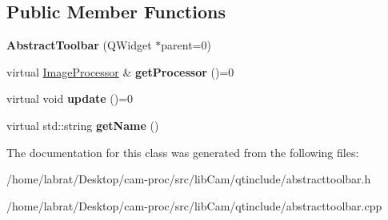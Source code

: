\subsection*{Public Member Functions}
\begin{DoxyCompactItemize}
\item 
{\bfseries Abstract\+Toolbar} (Q\+Widget $\ast$parent=0)\hypertarget{classAbstractToolbar_a9f7e3ff248be380c39f3370f585d356d}{}\label{classAbstractToolbar_a9f7e3ff248be380c39f3370f585d356d}

\item 
virtual \hyperlink{classImageProcessor}{Image\+Processor} \& {\bfseries get\+Processor} ()=0\hypertarget{classAbstractToolbar_adb5af62a3c4a558c69101bdd6f3d1dc1}{}\label{classAbstractToolbar_adb5af62a3c4a558c69101bdd6f3d1dc1}

\item 
virtual void {\bfseries update} ()=0\hypertarget{classAbstractToolbar_aac72f6530afd606e8f9d272f8459ef43}{}\label{classAbstractToolbar_aac72f6530afd606e8f9d272f8459ef43}

\item 
virtual std\+::string {\bfseries get\+Name} ()\hypertarget{classAbstractToolbar_ab367628bff78aa9fe6b31c2cf09c41d6}{}\label{classAbstractToolbar_ab367628bff78aa9fe6b31c2cf09c41d6}

\end{DoxyCompactItemize}


The documentation for this class was generated from the following files\+:\begin{DoxyCompactItemize}
\item 
/home/labrat/\+Desktop/cam-\/proc/src/lib\+Cam/qtinclude/abstracttoolbar.\+h\item 
/home/labrat/\+Desktop/cam-\/proc/src/lib\+Cam/qtinclude/abstracttoolbar.\+cpp\end{DoxyCompactItemize}
